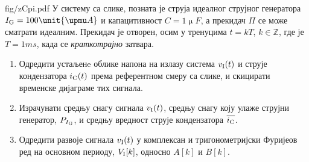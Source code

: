 \mnDifficult
\begin{slikaDesno}[0.833]{fig/zCpi.pdf}
    \PID У систему са слике, позната је струја идеалног струјног 
генератора ${I_{\rm G} = 100\unit{\upmu A}}$ и
капацитивност $C = 1\unit{\upmu F}$, а прекидач $\Pi$ се 
може сматрати идеалним. Прекидач је отворен, осим у тренуцима 
$t = kT$, $k \in \mathbb Z$, где је $T = 1\unit{ms}$, 
када се 
\textit{краткотрајно} затвара.

\begin{enumerate}[label = (\alph*)]
    \item
    Одредити устаљенe облике напона на излазу система 
    $v_{\rm I}(t)$ и струје кондензатора 
    $i_{\rm C}(t)$ према референтном смеру са слике, 
    и скицирати временске дијаграме тих сигнала.
\end{enumerate} 
\end{slikaDesno}

\begin{enumerate}[label = (\alph*)]   \setcounter{enumi}{1}
    \item Израчунати средњу снагу сигнала $v_{\rm I}(t)$,
    средњу снагу коју улаже струјни генератор, $P_{I_{\rm G}}$, и 
    средњу вредност струје кондензатора $\overline{i_{\rm C}}$. 
    
    \item
    Одредити развоје сигнала $v_{\rm I}(t)$ у комплексан и тригонометријски
    Фуријеов ред 
    на основном периоду, $V_{\rm I}[k]$, односно
    $A[k]$ и $B[k]$. 

\end{enumerate} 

\RESENJE

